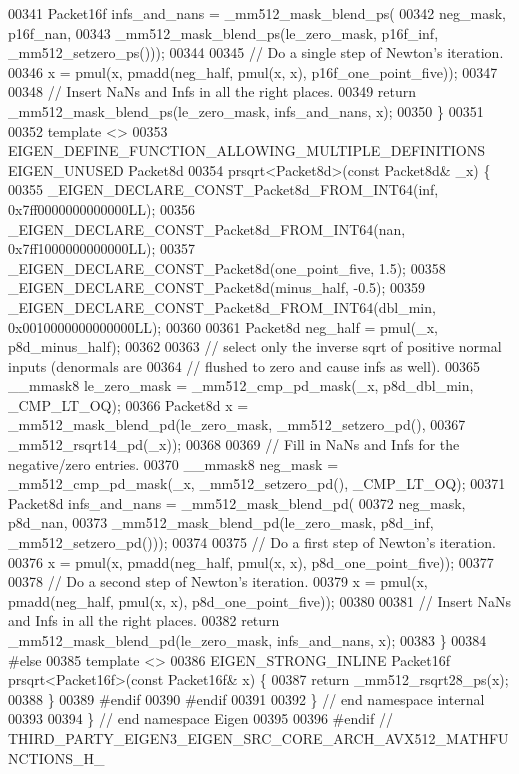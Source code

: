 \begin{DoxyCode}
00341   Packet16f infs\_and\_nans = \_mm512\_mask\_blend\_ps(
00342       neg\_mask, p16f\_nan,
00343       \_mm512\_mask\_blend\_ps(le\_zero\_mask, p16f\_inf, \_mm512\_setzero\_ps()));
00344 
00345   \textcolor{comment}{// Do a single step of Newton's iteration.}
00346   x = pmul(x, pmadd(neg\_half, pmul(x, x), p16f\_one\_point\_five));
00347 
00348   \textcolor{comment}{// Insert NaNs and Infs in all the right places.}
00349   \textcolor{keywordflow}{return} \_mm512\_mask\_blend\_ps(le\_zero\_mask, infs\_and\_nans, x);
00350 \}
00351 
00352 \textcolor{keyword}{template} <>
00353 EIGEN\_DEFINE\_FUNCTION\_ALLOWING\_MULTIPLE\_DEFINITIONS EIGEN\_UNUSED Packet8d
00354 prsqrt<Packet8d>(\textcolor{keyword}{const} Packet8d& \_x) \{
00355   \_EIGEN\_DECLARE\_CONST\_Packet8d\_FROM\_INT64(inf, 0x7ff0000000000000LL);
00356   \_EIGEN\_DECLARE\_CONST\_Packet8d\_FROM\_INT64(nan, 0x7ff1000000000000LL);
00357   \_EIGEN\_DECLARE\_CONST\_Packet8d(one\_point\_five, 1.5);
00358   \_EIGEN\_DECLARE\_CONST\_Packet8d(minus\_half, -0.5);
00359   \_EIGEN\_DECLARE\_CONST\_Packet8d\_FROM\_INT64(dbl\_min, 0x0010000000000000LL);
00360 
00361   Packet8d neg\_half = pmul(\_x, p8d\_minus\_half);
00362 
00363   \textcolor{comment}{// select only the inverse sqrt of positive normal inputs (denormals are}
00364   \textcolor{comment}{// flushed to zero and cause infs as well).}
00365   \_\_mmask8 le\_zero\_mask = \_mm512\_cmp\_pd\_mask(\_x, p8d\_dbl\_min, \_CMP\_LT\_OQ);
00366   Packet8d x = \_mm512\_mask\_blend\_pd(le\_zero\_mask, \_mm512\_setzero\_pd(),
00367                                     \_mm512\_rsqrt14\_pd(\_x));
00368 
00369   \textcolor{comment}{// Fill in NaNs and Infs for the negative/zero entries.}
00370   \_\_mmask8 neg\_mask = \_mm512\_cmp\_pd\_mask(\_x, \_mm512\_setzero\_pd(), \_CMP\_LT\_OQ);
00371   Packet8d infs\_and\_nans = \_mm512\_mask\_blend\_pd(
00372       neg\_mask, p8d\_nan,
00373       \_mm512\_mask\_blend\_pd(le\_zero\_mask, p8d\_inf, \_mm512\_setzero\_pd()));
00374 
00375   \textcolor{comment}{// Do a first step of Newton's iteration.}
00376   x = pmul(x, pmadd(neg\_half, pmul(x, x), p8d\_one\_point\_five));
00377 
00378   \textcolor{comment}{// Do a second step of Newton's iteration.}
00379   x = pmul(x, pmadd(neg\_half, pmul(x, x), p8d\_one\_point\_five));
00380 
00381   \textcolor{comment}{// Insert NaNs and Infs in all the right places.}
00382   \textcolor{keywordflow}{return} \_mm512\_mask\_blend\_pd(le\_zero\_mask, infs\_and\_nans, x);
00383 \}
00384 \textcolor{preprocessor}{#else}
00385 \textcolor{keyword}{template} <>
00386 EIGEN\_STRONG\_INLINE Packet16f prsqrt<Packet16f>(\textcolor{keyword}{const} Packet16f& x) \{
00387   \textcolor{keywordflow}{return} \_mm512\_rsqrt28\_ps(x);
00388 \}
00389 \textcolor{preprocessor}{#endif}
00390 \textcolor{preprocessor}{#endif}
00391 
00392 \}  \textcolor{comment}{// end namespace internal}
00393 
00394 \}  \textcolor{comment}{// end namespace Eigen}
00395 
00396 \textcolor{preprocessor}{#endif  // THIRD\_PARTY\_EIGEN3\_EIGEN\_SRC\_CORE\_ARCH\_AVX512\_MATHFUNCTIONS\_H\_}
\end{DoxyCode}
